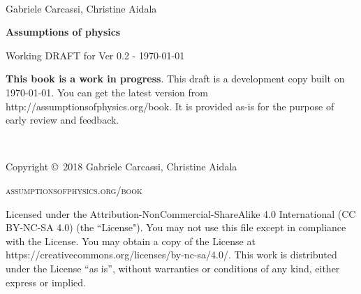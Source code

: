 \documentclass[11pt,letterpaper,fleqn]{memoir} %
\begin{document}
	




\frontmatter
\thispagestyle{empty}

~

\vspace{20pt}

{\large \noindent Gabriele Carcassi, Christine Aidala }

\vspace{60pt}

{\Huge \noindent \textbf{Assumptions of physics}}

\vspace{30pt}

{\large \noindent Working DRAFT for Ver 0.2  - \today}

\vfill


\noindent \textbf{This book is a work in progress}. This draft is a development copy built on \today. You can get the latest version from http://assumptionsofphysics.org/book. It is provided as-is for the purpose of early review and feedback. 

\newpage
~\vfill
\thispagestyle{empty}

\noindent Copyright \copyright\ 2018 Gabriele Carcassi, Christine Aidala

\vspace{12pt}

\noindent \textsc{assumptionsofphysics.org/book}

\vspace{12pt}

\noindent Licensed under the Attribution-NonCommercial-ShareAlike 4.0 International (CC BY-NC-SA 4.0) (the ``License"). You may not use this file except in compliance with the License. You may obtain a copy of the License at https://creativecommons.org/licenses/by-nc-sa/4.0/. This work is distributed under the License ``as is'', without warranties or conditions of any kind, either express or implied.
\end{document}
